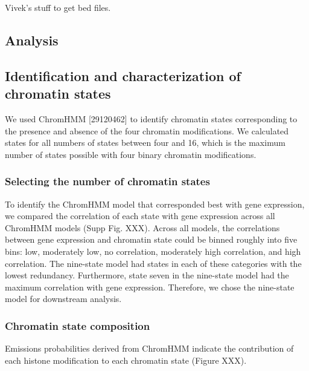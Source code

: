 \documentclass[10pt,letterpaper]{article}
\begin{document}
Vivek's stuff to get bed files.

\hypertarget{analysis}{%
\subsection{Analysis}\label{analysis}}

\hypertarget{identification-and-characterization-of-chromatin-states}{%
\subsection{Identification and characterization of chromatin
states}\label{identification-and-characterization-of-chromatin-states}}

We used ChromHMM {[}29120462{]} to identify chromatin states
corresponding to the presence and absence of the four chromatin
modifications. We calculated states for all numbers of states between
four and 16, which is the maximum number of states possible with four
binary chromatin modifications.

\hypertarget{selecting-the-number-of-chromatin-states}{%
\subsubsection{Selecting the number of chromatin
states}\label{selecting-the-number-of-chromatin-states}}

To identify the ChromHMM model that corresponded best with gene
expression, we compared the correlation of each state with gene
expression across all ChromHMM models (Supp Fig. XXX). Across all
models, the correlations between gene expression and chromatin state
could be binned roughly into five bins: low, moderately low, no
correlation, moderately high correlation, and high correlation. The
nine-state model had states in each of these categories with the lowest
redundancy. Furthermore, state seven in the nine-state model had the
maximum correlation with gene expression. Therefore, we chose the
nine-state model for downstream analysis.

\hypertarget{chromatin-state-composition}{%
\subsubsection{Chromatin state
composition}\label{chromatin-state-composition}}

Emissions probabilities derived from ChromHMM indicate the contribution
of each histone modification to each chromatin state (Figure XXX).
\end{document}
